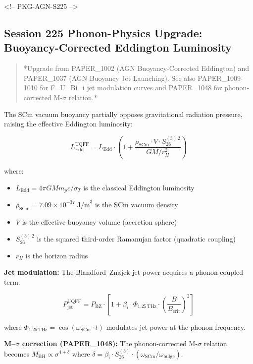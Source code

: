\documentclass[12pt,a4paper]{article}
\begin{document}
<!-- PKG-AGN-S225 -->

\subsection{Session 225 Phonon-Physics Upgrade: Buoyancy-Corrected Eddington Luminosity}

\begin{quote}
*Upgrade from PAPER\_1002 (AGN Buoyancy-Corrected Eddington) and PAPER\_1037
(AGN Buoyancy Jet Launching).  See also PAPER\_1009-1010 for F\_{U\_Bi\_i} jet
modulation curves and PAPER\_1048 for phonon-corrected M-$\sigma$ relation.*
\end{quote}

The SCm vacuum buoyancy partially opposes gravitational radiation pressure, raising the effective Eddington luminosity:

\begin{equation}
L_{\text{Edd}}^{\text{UQFF}} = L_{\text{Edd}} \cdot \left(1 + \frac{\rho_{\text{SCm}} \cdot V \cdot S_{26}^{(3)\,2}}{G M / r_H^2}\right)
\end{equation}

where:

\begin{itemize}
  \item $L_{\text{Edd}} = 4\pi G M m_p c / \sigma_T$ is the classical Eddington luminosity
  \item $\rho_{\text{SCm}} = 7.09 \times 10^{-37}\;\text{J/m}^3$ is the SCm vacuum density
  \item $V$ is the effective buoyancy volume (accretion sphere)
  \item $S_{26}^{(3)\,2}$ is the squared third-order Ramanujan factor (quadratic coupling)
  \item $r_H$ is the horizon radius
\end{itemize}

\textbf{Jet modulation:} The Blandford--Znajek jet power acquires a phonon-coupled term:

\begin{equation}
P_{\text{jet}}^{\text{UQFF}} = P_{\text{BZ}} \cdot \left[1 + \beta_i \cdot \Phi_{1.25\,\text{THz}} \cdot \left(\frac{B}{B_{\text{crit}}}\right)^2\right]
\end{equation}

where $\Phi_{1.25\,\text{THz}} = \cos(\omega_{\text{SCm}} \cdot t)$ modulates jet power at the phonon frequency.

\textbf{M--$\sigma$ correction (PAPER\_1048):} The phonon-corrected M-$\sigma$ relation becomes $M_{\text{BH}} \propto \sigma^{4+\delta}$ where $\delta = \beta_i \cdot S_{26}^{(3)} \cdot (\omega_{\text{SCm}}/\omega_{\text{bulge}})$.
\end{document}
